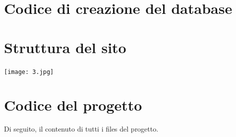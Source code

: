 \documentclass[a4paper]{report}
\begin{document}
\chapter{Codice di creazione del database}

\chapter{Struttura del sito}
\begin{center}
\texttt{[image: 3.jpg]}
\end{center}
\chapter{Codice del progetto}
Di seguito, il contenuto di tutti i files del progetto.






















\lstset{inputpath=C:/Users/valdemar/Documents/BasiDiDati/Basi/css}



\end{document}
